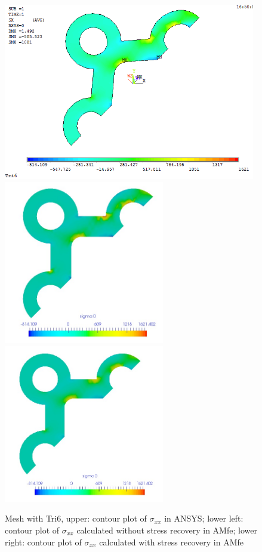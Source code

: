 \begin{figure}[htbp]
	\begin{center}
		\includegraphics[width=11cm,clip]{Tri6_Sxx.png} 	
		\includegraphics[width=7cm,clip]{Tri6_Sxx_PD.png} 	
		\includegraphics[width=7cm,clip]{Tri6_Sxx_P.png} 		
		\caption{Mesh with Tri6, upper: contour plot of $\sigma_{xx}$ in ANSYS; lower left: contour plot of $\sigma_{xx}$ calculated without stress recovery in AMfe; lower right: contour plot of $\sigma_{xx}$ calculated with stress recovery in AMfe} \label{fig: Tri6_Sxx}
	\end{center}
\end{figure}
\clearpage 

